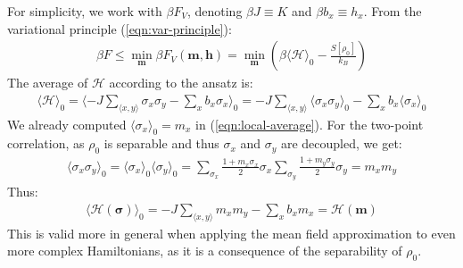 \documentclass[../../main.tex]{subfiles}
\begin{document}
For simplicity, we work with $\beta F_V$, denoting $\beta J \equiv K$ and $\beta b_x \equiv h_x$. From the variational principle (\ref{eqn:var-principle}):
\begin{align}
    \beta F \leq  
    \min_{\bm{m}} \beta F_V(\bm{m}, \bm{h}) = \min_{\bm{m}} \left(
      \beta \langle \mathcal{H} \rangle_0 -\frac{S[\rho_0]}{k_B} \right) 
      \label{eqn:ising-variational}
\end{align}
The average of $\mathcal{H}$ according to the ansatz is:
\begin{align*}
    \langle \mathcal{H} \rangle_0 = \langle -J \sum_{\langle x,y \rangle} \sigma_x \sigma_y - \sum_x b_x \sigma_x \rangle_0 = -J \sum_{\langle x,y \rangle} \langle \sigma_x \sigma_y \rangle_0 - \sum_x b_x \langle \sigma_x \rangle_0
\end{align*}
We already computed $\langle \sigma_x \rangle_0 = m_x$ in (\ref{eqn:local-average}). For the two-point correlation, as $\rho_0$ is separable and thus $\sigma_x$ and $\sigma_y$ are decoupled, we get:
\begin{align*}
    \langle \sigma_x \sigma_y \rangle_0 = \langle \sigma_x \rangle_0 \langle \sigma_y \rangle_0 = \sum_{\sigma_x} \frac{1+m_x \sigma_x}{2} \sigma_x \sum_{\sigma_y} \frac{1+m_y \sigma_y}{2} \sigma_y = m_x m_y
\end{align*}
Thus:
\begin{align}\label{eqn:H0avg}
    \langle \mathcal{H}(\bm{\sigma}) \rangle_0 = -J \sum_{\langle x,y \rangle} m_x m_y - \sum_x b_x m_x = \mathcal{H}(\bm{m})
\end{align}
This is valid more in general when applying the mean field approximation to even more complex Hamiltonians, as it is a consequence of the separability of $\rho_0$.

\medskip
\end{document}
